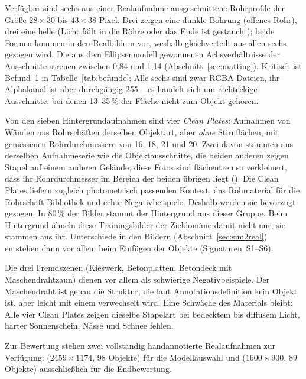 \label{sec:quellmaterial} Verfügbar sind sechs aus einer
Realaufnahme ausgeschnittene Rohrprofile der Größe $28\times30$ bis $43\times38$
Pixel. Drei zeigen eine dunkle Bohrung (offenes Rohr), drei eine helle
(Licht fällt in die Röhre oder das Ende ist gestaucht); beide Formen
kommen in den Realbildern vor, weshalb gleichverteilt aus allen sechs gezogen
wird. Die aus dem
Ellipsenmodell gewonnenen Achsverhältnisse der Ausschnitte streuen zwischen 0,84
und 1,14 (Abschnitt~\ref{sec:matting}). Kritisch ist Befund~1 in
Tabelle~\ref{tab:befunde}: Alle sechs sind zwar RGBA-Dateien, ihr Alphakanal ist
aber durchgängig 255 -- es handelt sich um rechteckige Ausschnitte, bei denen
13--35\,\% der Fläche nicht zum Objekt gehören.

 Von den sieben Hintergrundaufnahmen sind vier
\emph{Clean Plates}: Aufnahmen von Wänden aus Rohrschäften derselben Objektart,
aber \emph{ohne} Stirnflächen, mit gemessenen Rohrdurchmessern von 16, 18, 21
und 20\px. Zwei davon stammen aus derselben Aufnahmeserie wie die
Objektausschnitte, die beiden anderen zeigen Stapel auf einem anderen Gelände;
diese Fotos sind flächentreu so verkleinert, dass ihr Rohrdurchmesser im
Bereich der beiden übrigen liegt (). Die Clean Plates
liefern zugleich photometrisch passenden Kontext, das
Rohmaterial für die Rohrschaft-Bibliothek und echte Negativbeispiele. Deshalb
werden sie bevorzugt gezogen: In 80\,\% der Bilder stammt der Hintergrund aus
dieser Gruppe. Beim
Hintergrund ähneln diese Trainingsbilder der Zieldomäne damit nicht nur, sie
stammen aus ihr. Unterschiede in den Bildern (Abschnitt~\ref{sec:sim2real})
entstehen dann vor allem beim Einfügen der Objekte (Signaturen~S1--S6).

Die drei Fremdszenen (Kieswerk, Betonplatten, Betondeck mit
Maschendrahtzaun) dienen vor allem als schwierige Negativbeispiele. Der
Maschendraht ist genau die Struktur, die laut Annotationsdefinition kein Objekt
ist, aber leicht mit einem verwechselt wird. Eine Schwäche des Materials bleibt:
Alle vier Clean Plates zeigen dieselbe Stapelart bei bedecktem bis diffusem
Licht, harter Sonnenschein, Nässe und Schnee fehlen.

\label{sec:valtest} Zur Bewertung stehen zwei vollständig handannotierte Realaufnahmen zur
Verfügung:  ($2459\times1174$, 98 Objekte) für die Modellauswahl und
 ($1600\times900$, 89 Objekte) ausschließlich für die Endbewertung.

